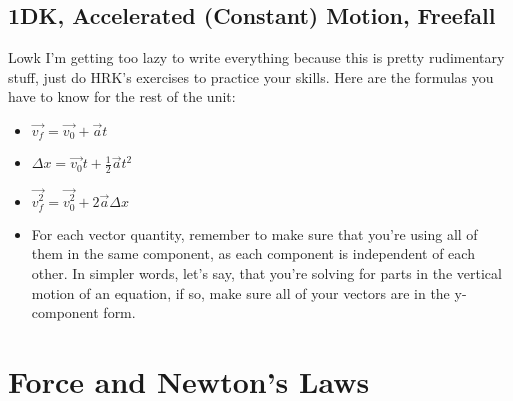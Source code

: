 \documentclass[openany]{book}
\begin{document}
    \section{1DK, Accelerated (Constant) Motion, Freefall}
    \quad Lowk I'm getting too lazy to write everything because this is pretty rudimentary stuff, just do HRK's exercises to practice your skills. Here are the formulas you have to know for the rest of the unit:

    \begin{itemize}
        \item $\vec{v_f} = \vec{v_0} + \vec{a}t$
        \item $\Delta x = \vec{v_0}t + \frac{1}{2}\vec{a}t^{2}$
        \item $\vec{v_f^{2}} = \vec{v_0^{2}} + 2\vec{a}\Delta x$
        \item For each vector quantity, remember to make sure that you're using all of them in the same component, as each component is independent of each other. In simpler words, let's say, that you're solving for parts in the vertical motion of an equation, if so, make sure all of your vectors are in the y-component form.
    \end{itemize}

\chapter{Force and Newton's Laws}
\end{document}
